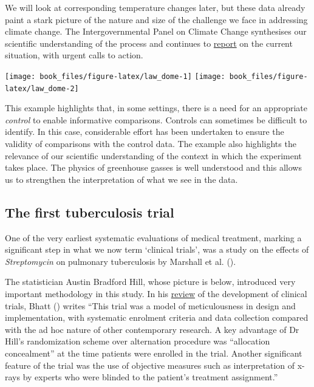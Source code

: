 \documentclass[
]{book}
\begin{document}
We will look at corresponding temperature changes later, but these data already paint a stark picture of the nature and size of the challenge we face in addressing climate change. The Intergovernmental Panel on Climate Change synthesises our scientific understanding of the process and continues to \href{https://www.ipcc.ch/2021/08/09/ar6-wg1-20210809-pr/}{report} on the current situation, with urgent calls to action.

\texttt{[image: book\_files/figure-latex/law\_dome-1]} \texttt{[image: book\_files/figure-latex/law\_dome-2]}

This example highlights that, in some settings, there is a need for an appropriate \emph{control} to enable informative comparisons. Controls can sometimes be difficult to identify. In this case, considerable effort has been undertaken to ensure the validity of comparisons with the control data. The example also highlights the relevance of our scientific understanding of the context in which the experiment takes place. The physics of greenhouse gasses is well understood and this allows us to strengthen the interpretation of what we see in the data.

\subsection{The first tuberculosis trial}\label{the-first-tuberculosis-trial}

One of the very earliest systematic evaluations of medical treatment, marking a significant step in what we now term `clinical trials', was a study on the effects of \emph{Streptomycin} on pulmonary tuberculosis by Marshall et al. ().

The statistician Austin Bradford Hill, whose picture is below, introduced very important methodology in this study. In his \href{https://www.ncbi.nlm.nih.gov/pmc/articles/PMC3149409/}{review} of the development of clinical trials, Bhatt () writes ``This trial was a model of meticulousness in design and implementation, with systematic enrolment criteria and data collection compared with the ad hoc nature of other contemporary research. A key advantage of Dr Hill's randomization scheme over alternation procedure was ``allocation concealment'' at the time patients were enrolled in the trial. Another significant feature of the trial was the use of objective measures such as interpretation of x-rays by experts who were blinded to the patient's treatment assignment.''
\end{document}
